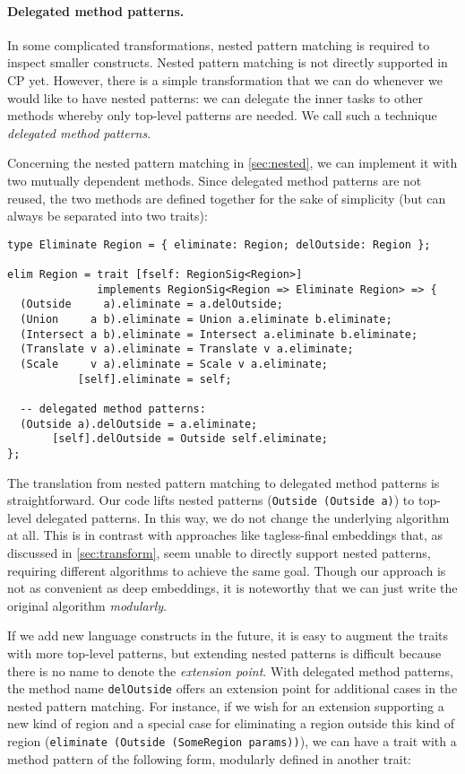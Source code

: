 \paragraph{Delegated method patterns.}
In some complicated transformations, nested pattern matching is required to
inspect smaller constructs. Nested pattern matching is not directly supported in
CP yet. However, there is a simple transformation that we can do whenever we
would like to have nested patterns:  we can delegate the inner tasks to other
methods whereby only top-level patterns are needed. We call such a technique
\emph{delegated method patterns}.

Concerning the nested pattern matching in \autoref{sec:nested}, we can implement
it with two mutually dependent methods. Since delegated method patterns are not
reused, the two methods are defined together for the sake of simplicity (but can
always be separated into two traits):

\begin{lstlisting}
type Eliminate Region = { eliminate: Region; delOutside: Region };

elim Region = trait [fself: RegionSig<Region>]
              implements RegionSig<Region => Eliminate Region> => {
  (Outside     a).eliminate = a.delOutside;
  (Union     a b).eliminate = Union a.eliminate b.eliminate;
  (Intersect a b).eliminate = Intersect a.eliminate b.eliminate;
  (Translate v a).eliminate = Translate v a.eliminate;
  (Scale     v a).eliminate = Scale v a.eliminate;
           [self].eliminate = self;

  -- delegated method patterns:
  (Outside a).delOutside = a.eliminate;
       [self].delOutside = Outside self.eliminate;
};
\end{lstlisting}

\noindent The translation from nested pattern matching to delegated method
patterns is straightforward. Our code lifts nested patterns
(\lstinline{Outside (Outside a)}) to top-level delegated patterns. In this way,
we do not change the underlying algorithm at all. This is in contrast with
approaches like tagless-final embeddings that, as discussed in
\autoref{sec:transform}, seem unable to directly support nested patterns,
requiring different algorithms to achieve the same goal. Though our approach is
not as convenient as deep embeddings, it is noteworthy that we can just write
the original algorithm \emph{modularly}.

If we add new language constructs in the future, it is easy to augment the
traits with more top-level patterns, but extending nested patterns is difficult
because there is no name to denote the \emph{extension point}. With delegated
method patterns, the method name \lstinline{delOutside} offers an extension
point for additional cases in the nested pattern matching. For instance, if we
wish for an extension supporting a new kind of region and a special case for
eliminating a region outside this kind of region
(\lstinline{eliminate (Outside (SomeRegion params))}), we can have a trait with
a method pattern of the following form, modularly defined in another trait:

